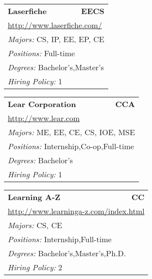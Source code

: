 \documentclass[twoside]{article}
\begin{document}
\begin{center}
\begin{multicols}{3}
\begin{FlushLeft}
\begin{minipage}{.9\columnwidth}
\end{minipage}
 
\begin{minipage}{.9\columnwidth}\begin{tabularx}{.95\columnwidth}{Xr}
                 {\Large\bf Laserfiche} & {\Large\bf EECS}\\
    \multicolumn{2}{p{.95\columnwidth}}{\url{http://www.laserfiche.com/}}\\
    \multicolumn{2}{p{.95\columnwidth}}{\emph{Majors:} CS, IP, EE, EP, CE}\\
    \multicolumn{2}{p{.95\columnwidth}}{\emph{Positions:} Full-time}\\
    \multicolumn{2}{p{.95\columnwidth}}{\emph{Degrees:} Bachelor's,Master's}\\
    \multicolumn{2}{p{.95\columnwidth}}{\emph{Hiring Policy:} 1}\\
    \end{tabularx}
    
\end{minipage}
 
\begin{minipage}{.9\columnwidth}\begin{tabularx}{.95\columnwidth}{Xr}
                 {\Large\bf Lear Corporation} & {\Large\bf CCA}\\
    \multicolumn{2}{p{.95\columnwidth}}{\url{http://www.lear.com}}\\
    \multicolumn{2}{p{.95\columnwidth}}{\emph{Majors:} ME, EE, CE, CS, IOE, MSE}\\
    \multicolumn{2}{p{.95\columnwidth}}{\emph{Positions:} Internship,Co-op,Full-time}\\
    \multicolumn{2}{p{.95\columnwidth}}{\emph{Degrees:} Bachelor's}\\
    \multicolumn{2}{p{.95\columnwidth}}{\emph{Hiring Policy:} 1}\\
    \end{tabularx}
    
\end{minipage}
 
\begin{minipage}{.9\columnwidth}\begin{tabularx}{.95\columnwidth}{Xr}
                 {\Large\bf Learning A-Z} & {\Large\bf CC}\\
    \multicolumn{2}{p{.95\columnwidth}}{\url{http://www.learninga-z.com/index.html}}\\
    \multicolumn{2}{p{.95\columnwidth}}{\emph{Majors:} CS, CE}\\
    \multicolumn{2}{p{.95\columnwidth}}{\emph{Positions:} Internship,Full-time}\\
    \multicolumn{2}{p{.95\columnwidth}}{\emph{Degrees:} Bachelor's,Master's,Ph.D.}\\
    \multicolumn{2}{p{.95\columnwidth}}{\emph{Hiring Policy:} 2}\\
    \end{tabularx}
    

\end{minipage}
\end{FlushLeft}
\end{multicols}
\end{center}
\end{document}
